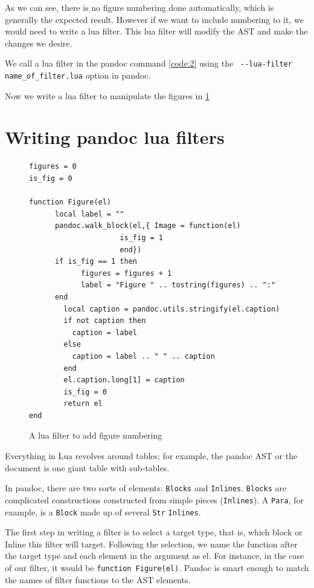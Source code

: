 As we can see, there is no figure numbering done automatically, which is generally
the expected result. However if we want to include numbering to it, we would need
to write a lua filter. This lua filter will modify the AST and make the changes we 
desire.

We call a lua filter in the pandoc command \ref{code:2} using the \verb| --lua-filter name_of_filter.lua|
option in pandoc.

Now we write a lua filter to manipulate the figures in \ref{code:3}

\section{Writing pandoc lua filters}

\begin{figure}[htbp]
\begin{verbatim}
figures = 0
is_fig = 0

function Figure(el)
      local label = ""
      pandoc.walk_block(el,{ Image = function(el)
                     is_fig = 1
                     end})
      if is_fig == 1 then
	        figures = figures + 1
	        label = "Figure " .. tostring(figures) .. ":"
      end
	    local caption = pandoc.utils.stringify(el.caption)
	    if not caption then
          caption = label
    	else
          caption = label .. " " .. caption
    	end
    	el.caption.long[1] = caption
    	is_fig = 0
    	return el
end
\end{verbatim}
\caption{A lua filter to add figure numbering}
\label{code:3}
\end{figure}

Everything in Lua revolves around tables; for example, the pandoc AST or the document is one giant table with sub-tables.

In pandoc, there are two sorts of elements: \verb|Blocks| and \verb|Inlines|. \verb|Blocks| are complicated constructions constructed from simple pieces (\verb|Inlines|). A \verb|Para|, for example, is a \verb|Block| made up of several \verb|Str| \verb|Inlines|.

The first step in writing a filter is to select a target type, that is, which block or Inline this filter will target.
Following the selection, we name the function after the target type and each element in the argument as el.
For instance, in the case of our filter, it would be \verb|function Figure(el)|. Pandoc is smart enough to match the names of filter functions to the AST elements.

